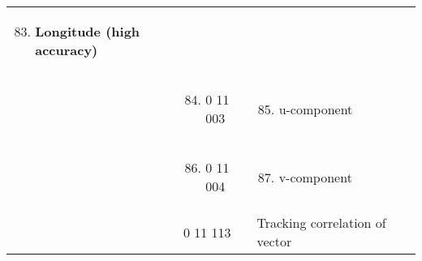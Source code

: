 \begin{longtable}[]{@{}llll@{}}
\begin{minipage}[t]{0.22\columnwidth}
\begin{enumerate}
\setcounter{enumi}{82}
\item
  \textbf{Longitude (high accuracy)}
\end{enumerate}\strut
\end{minipage} & \begin{minipage}[t]{0.22\columnwidth}\raggedright
\strut
\end{minipage}\tabularnewline
\begin{minipage}[t]{0.22\columnwidth}\raggedright
\strut
\end{minipage} & \begin{minipage}[t]{0.22\columnwidth}\raggedright
\begin{enumerate}
\setcounter{enumi}{83}
\item
  0 11 003
\end{enumerate}\strut
\end{minipage} & \begin{minipage}[t]{0.22\columnwidth}\raggedright
\begin{enumerate}
\setcounter{enumi}{84}
\item
  u-component
\end{enumerate}\strut
\end{minipage} & \begin{minipage}[t]{0.22\columnwidth}\raggedright
\strut
\end{minipage}\tabularnewline
\begin{minipage}[t]{0.22\columnwidth}\raggedright
\strut
\end{minipage} & \begin{minipage}[t]{0.22\columnwidth}\raggedright
\begin{enumerate}
\setcounter{enumi}{85}
\item
  0 11 004
\end{enumerate}\strut
\end{minipage} & \begin{minipage}[t]{0.22\columnwidth}\raggedright
\begin{enumerate}
\setcounter{enumi}{86}
\item
  v-component
\end{enumerate}\strut
\end{minipage} & \begin{minipage}[t]{0.22\columnwidth}\raggedright
\strut
\end{minipage}\tabularnewline
& 0 11 113 & Tracking correlation of vector &\tabularnewline
\bottomrule
\end{longtable}

